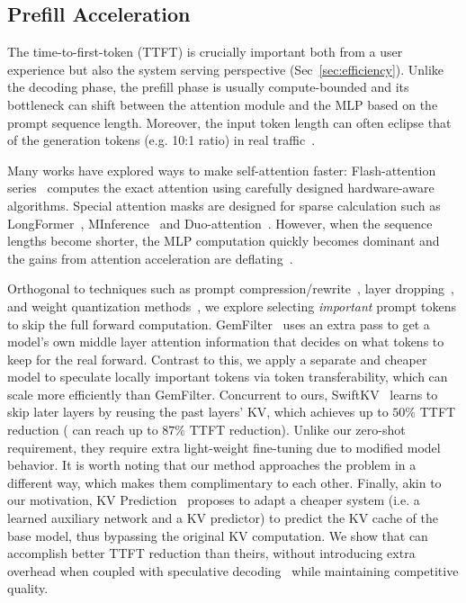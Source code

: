 \subsection{Prefill Acceleration}

The time-to-first-token (TTFT) is crucially important both from a user experience but also the system serving perspective (Sec~\ref{sec:efficiency}). Unlike the decoding phase, the prefill phase is usually compute-bounded and its bottleneck can shift between the attention module and the MLP based on the prompt sequence length. Moreover, the input token length can often eclipse that of the generation tokens (e.g. 10:1 ratio) in real traffic~\cite{qiao2024swiftkvfastprefilloptimizedinference}. 

Many works have explored ways to make self-attention faster: Flash-attention series~\cite{dao2022flashattentionfastmemoryefficientexact, dao2023flashattention2fasterattentionbetter} computes the exact attention using carefully designed hardware-aware algorithms. Special attention masks are designed for sparse calculation such as LongFormer~\cite{beltagy2020longformerlongdocumenttransformer}, MInference~\cite{jiang2024minference10acceleratingprefilling} and Duo-attention~\cite{xiao2024duoattentionefficientlongcontextllm}. However, when the sequence lengths become shorter, the MLP computation quickly becomes dominant and the gains from attention acceleration are deflating~\cite{xiong2023effectivelongcontextscalingfoundation}. 

Orthogonal to techniques such as prompt compression/rewrite~\cite{jiang2023llmlinguacompressingpromptsaccelerated, jiang2024longllmlinguaacceleratingenhancingllms}, layer dropping~\cite{Elhoushi_2024}, and weight quantization methods~\cite{lin2024awqactivationawareweightquantization}, we explore selecting \textit{important} prompt tokens to skip the full forward computation. GemFilter~\cite{shi2024discoveringgemsearlylayers} uses an extra pass to get a model's own middle layer attention information that decides on what tokens to keep for the real forward. Contrast to this, we apply a separate and cheaper model to speculate locally important tokens via token transferability, which can scale more efficiently than GemFilter. Concurrent to ours, SwiftKV~\cite{qiao2024swiftkvfastprefilloptimizedinference} learns to skip later layers by reusing the past layers' KV, which achieves up to $50\%$ TTFT reduction (\ours{} can reach up to $87\%$ TTFT reduction). Unlike our zero-shot requirement, they require extra light-weight fine-tuning due to modified model behavior. It is worth noting that our method approaches the problem in a different way, which makes them complimentary to each other. Finally, akin to our motivation, KV Prediction~\cite{horton2024kvpredictionimprovedtime} proposes to adapt a cheaper system (i.e. a learned auxiliary network and a KV predictor) to predict the KV cache of the base model, thus bypassing the original KV computation. We show that \ours{} can accomplish better TTFT reduction than theirs, without introducing extra overhead when coupled with speculative decoding~\cite{leviathan2023fastinferencetransformersspeculative} while maintaining competitive quality. 
